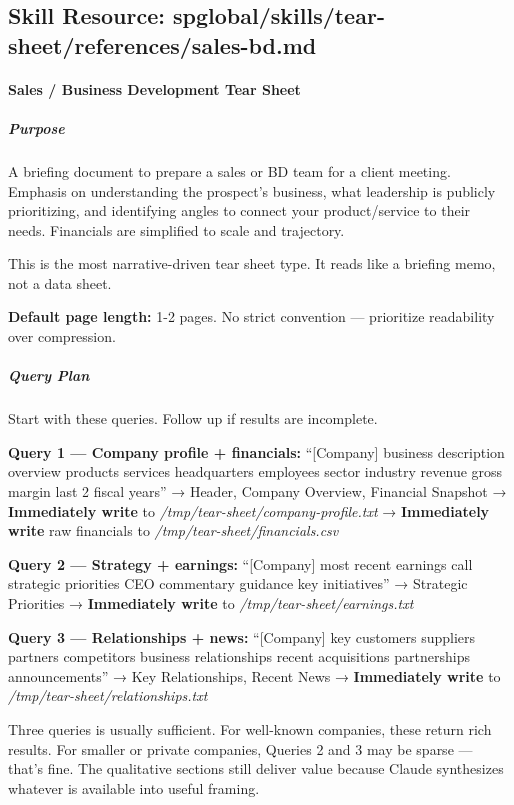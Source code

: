 \documentclass[11pt]{article}
\begin{document}
\subsection{Skill Resource: spglobal/skills/tear-sheet/references/sales-bd.md}\label{file:spglobal-skills-tear-sheet-references-sales-bd.md}

\paragraph{Sales / Business Development Tear Sheet}\mbox{}\par

\subparagraph{Purpose}\mbox{}\par
A briefing document to prepare a sales or BD team for a client meeting. Emphasis on understanding the prospect's business, what leadership is publicly prioritizing, and identifying angles to connect your product/service to their needs. Financials are simplified to scale and trajectory.


This is the most narrative-driven tear sheet type. It reads like a briefing memo, not a data sheet.


\textbf{Default page length:} 1-2 pages. No strict convention — prioritize readability over compression.


\subparagraph{Query Plan}\mbox{}\par

Start with these queries. Follow up if results are incomplete.


\textbf{Query 1 — Company profile + financials:} ``[Company] business description overview products services headquarters employees sector industry revenue gross margin last 2 fiscal years'' → Header, Company Overview, Financial Snapshot → \textbf{Immediately write} to \emph{/tmp/tear-sheet/company-profile.txt} → \textbf{Immediately write} raw financials to \emph{/tmp/tear-sheet/financials.csv}


\textbf{Query 2 — Strategy + earnings:} ``[Company] most recent earnings call strategic priorities CEO commentary guidance key initiatives'' → Strategic Priorities → \textbf{Immediately write} to \emph{/tmp/tear-sheet/earnings.txt}


\textbf{Query 3 — Relationships + news:} ``[Company] key customers suppliers partners competitors business relationships recent acquisitions partnerships announcements'' → Key Relationships, Recent News → \textbf{Immediately write} to \emph{/tmp/tear-sheet/relationships.txt}


Three queries is usually sufficient. For well-known companies, these return rich results. For smaller or private companies, Queries 2 and 3 may be sparse — that's fine. The qualitative sections still deliver value because Claude synthesizes whatever is available into useful framing.
\end{document}
